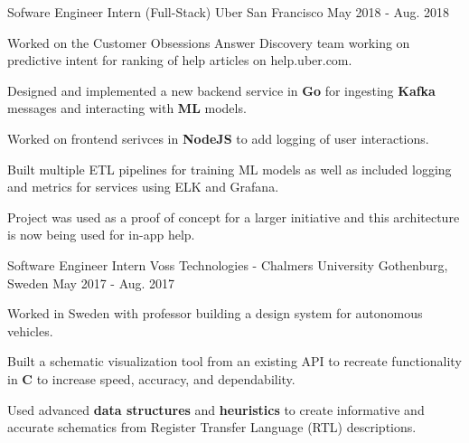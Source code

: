 

\begin{cventries}

  \cventry
    {Sofware Engineer Intern (Full-Stack)} %
    {Uber} %
    {San Francisco} %
    {May 2018 - Aug. 2018} %
    {
      \begin{cvitems} %
        \item {Worked on the Customer Obsessions Answer Discovery team working on predictive intent for ranking of help articles on help.uber.com.}
        \item {Designed and implemented a new backend service in \textbf{Go} for ingesting \textbf{Kafka} messages and interacting with \textbf{ML} models.}
        \item {Worked on frontend serivces in \textbf{NodeJS} to add logging of user interactions.}
        \item {Built multiple ETL pipelines for training ML models as well as included logging and metrics for services using ELK and Grafana.}
        \item {Project was used as a proof of concept for a larger initiative and this architecture is now being used for in-app help.}
      \end{cvitems}
    }

  \cventry
    {Software Engineer Intern} %
    {Voss Technologies - Chalmers University} %
    {Gothenburg, Sweden} %
    {May 2017 - Aug. 2017} %
    {
      \begin{cvitems} %
        \item Worked in Sweden with professor building a design system for autonomous vehicles.
        \item Built a schematic visualization tool from an existing API to recreate functionality in \textbf{C} to increase speed, accuracy, and dependability. 
        \item Used advanced \textbf{data structures} and \textbf{heuristics} to create informative and accurate schematics from Register Transfer Language (RTL) descriptions.
      \end{cvitems}
    }


\end{cventries}
